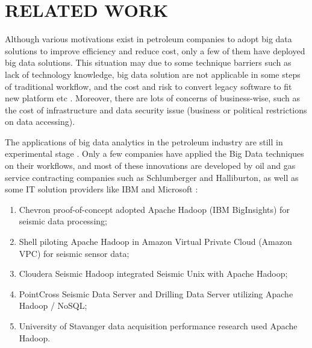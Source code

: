 %
%
%

\chapter{\uppercase{Related Work}}


Although various motivations exist in petroleum companies to adopt big data solutions to improve efficiency and reduce cost, only a few of them have deployed big data solutions. This situation may due to some technique barriers such as lack of technology knowledge, big data solution are not applicable in some steps of traditional workflow, and the cost and risk to convert legacy software to fit new platform etc \cite{bigdatatooil}. Moreover, there are lots of concerns of business-wise, such as the cost of infrastructure and data security issue (business or political restrictions on data accessing). 

The applications of big data analytics in the petroleum industry are still in experimental stage \cite{bigdatatooil}. Only a few companies have applied the Big Data techniques on their workflows, and most of these innovations are developed by oil and gas service contracting companies such as Schlumberger and Halliburton, as well as some IT solution providers like IBM and Microsoft  \cite{bigdatatooil}: 
\begin{enumerate}
  \item Chevron proof-of-concept adopted Apache Hadoop (IBM BigInsights) for seismic data processing;
  \item Shell piloting Apache Hadoop in Amazon Virtual Private Cloud (Amazon VPC) for seismic sensor data;
  \item Cloudera Seismic Hadoop integrated Seismic Unix with Apache Hadoop;
  \item PointCross Seismic Data Server and Drilling Data Server utilizing Apache Hadoop / NoSQL;
  \item University of Stavanger data acquisition performance research used Apache Hadoop.
\end{enumerate}


